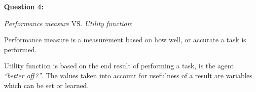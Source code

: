 \textbf{Question 4:}


\emph{Performance measure} VS. \emph{Utility function}: 

Performance measure is a measurement based on how well, or accurate a task is performed. 

Utility function is based on the end result of performing a task, is the agent \emph{``better off?''}. The values taken into account for usefulness of a result are variables which can be set or learned.

